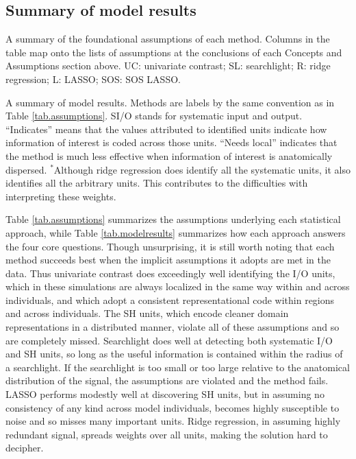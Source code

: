 \subsection{Summary of model results}
\begin{sidewaystable}
\singlespacing

\caption{A summary of the foundational assumptions of each method. Columns in the table map onto the lists of assumptions at the conclusions of each Concepts and Assumptions section above. UC: univariate contrast; SL: searchlight; R: ridge regression; L: LASSO; SOS: SOS LASSO.}
\label{tab.assumptions}
\end{sidewaystable}

\begin{table}

\caption{A summary of model results. Methods are labels by the same convention as in Table \ref{tab.assumptions}. SI/O stands for systematic input and output. ``Indicates'' means that the values attributed to identified units indicate how information of interest is coded across those units. ``Needs local'' indicates that the method is much less effective when information of interest is anatomically dispersed. $^*$Although ridge regression does identify all the systematic units, it also identifies all the arbitrary units. This contributes to the difficulties with interpreting these weights.}
\label{tab.modelresults}
\end{table}

Table \ref{tab.assumptions} summarizes the assumptions underlying each statistical approach, while Table \ref{tab.modelresults} summarizes how each approach answers the four core questions. Though unsurprising, it is still worth noting that each method succeeds best when the implicit assumptions it adopts are met in the data. Thus univariate contrast does exceedingly well identifying the I/O units, which in these simulations are always localized in the same way within and across individuals, and which adopt a consistent representational code within regions and across individuals. The SH units, which encode cleaner domain representations in a distributed manner, violate all of these assumptions and so are completely missed. Searchlight does well at detecting both systematic I/O and SH units, so long as the useful information is contained within the radius of a searchlight. If the searchlight is too small or too large relative to the anatomical distribution of the signal, the assumptions are violated and the method fails. LASSO performs modestly well at discovering SH units, but in assuming no consistency of any kind across model individuals, becomes highly susceptible to noise and so misses many important units. Ridge regression, in assuming highly redundant signal, spreads weights over all units, making the solution hard to decipher.

